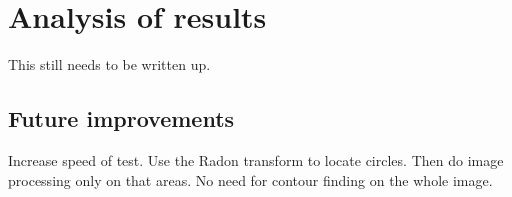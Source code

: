 \chapter{Analysis of results}
\label{ch:Results}
\ifpdf
\graphicspath{{Chapter5/Chapter5Figures/}}
\fi

This still needs to be written up.

\section{Future improvements}

Increase speed of test. Use the Radon transform to locate circles. Then do image processing only on that areas. No need for contour finding on the whole image.
